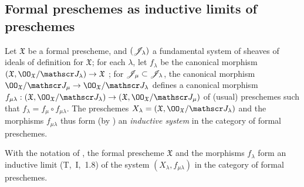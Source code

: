\subsection{Formal preschemes as inductive limits of preschemes}
\label{subsection:1.10.6}

\begin{env}[10.6.1]
\label{1.10.6.1}
Let $\mathfrak{X}$ be a formal prescheme, and $(\mathscr{J}_\lambda)$ a fundamental system of sheaves of ideals of definition for $\mathfrak{X}$; for each $\lambda$, let $f_\lambda$ be the canonical morphism $(\mathfrak{X},\OO_\mathfrak{X}/\sh{J}_\lambda)\to\mathfrak{X}$ ; for $\mathscr{J}_\mu\subset\mathscr{J}_\lambda$, the canonical morphism $\OO_\mathfrak{X}/\sh{J}_\mu\to\OO_\mathfrak{X}/\sh{J}_\lambda$ defines a canonical morphism
$f_{\mu\lambda}:(\mathfrak{X},\OO_\mathfrak{X}/\sh{J}_\lambda)\to(\mathfrak{X},\OO_\mathfrak{X}/\sh{J}_\mu)$ of (usual) preschemes such that $f_\lambda=f_\mu\circ f_{\mu\lambda}$.
The preschemes $X_\lambda=(\mathfrak{X},\OO_\mathfrak{X}/\sh{J}_\lambda)$ and the morphisms $f_{\mu\lambda}$ thus form (by ) an \emph{inductive system} in the category of formal preschemes.
\end{env}

\begin{prop}[10.6.2]
\label{1.10.6.2}
With the notation of , the formal prescheme $\mathfrak{X}$ and the morphisms $f_\lambda$ form an inductive limit (T,~I,~1.8) of the system $(X_\lambda,f_{\mu\lambda})$ in the category of formal preschemes.
\end{prop}

